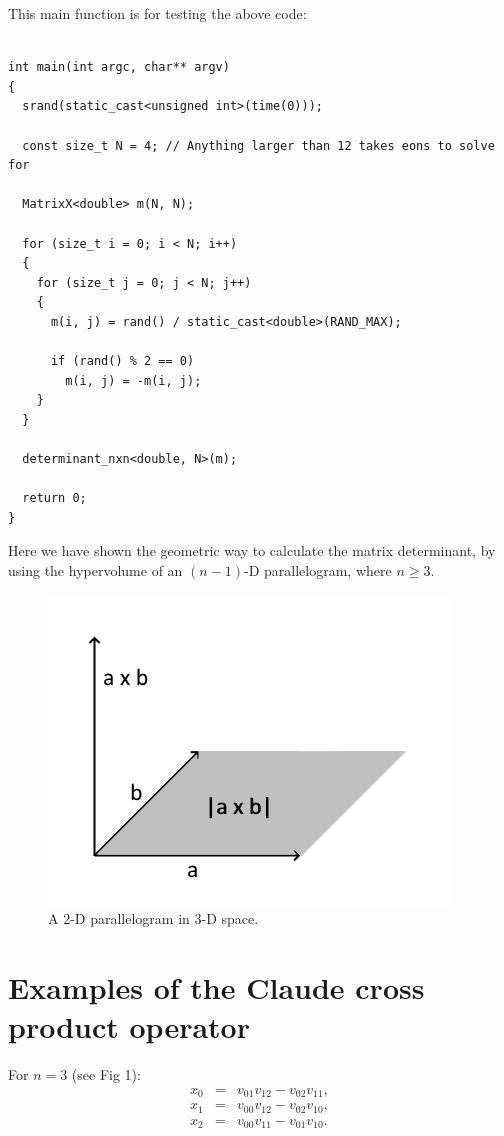 \documentclass[12pt]{article}
\begin{document}
This main function is for testing the above code:
\begin{lstlisting}

int main(int argc, char** argv)
{
  srand(static_cast<unsigned int>(time(0)));

  const size_t N = 4; // Anything larger than 12 takes eons to solve for

  MatrixX<double> m(N, N);

  for (size_t i = 0; i < N; i++)
  {
    for (size_t j = 0; j < N; j++)
    {
      m(i, j) = rand() / static_cast<double>(RAND_MAX);

      if (rand() % 2 == 0)
        m(i, j) = -m(i, j);
    }
  }

  determinant_nxn<double, N>(m);

  return 0;
}
\end{lstlisting}
Here we have shown the geometric way to calculate the matrix determinant, by using the hypervolume of an $(n - 1)$-D parallelogram, where $n \ge 3$.

\begin{figure} 
\centering
  \includegraphics[width = 3 in]{parallelogram.png}
  \caption{
A $2$-D parallelogram in $3$-D space.
}
\end{figure}

\section{Examples of the Claude cross product operator}
For $n = 3$ (see Fig 1):
\begin{eqnarray}
x_{0} &=& v_{01} v_{12} - v_{02} v_{11},\\
x_{1} &=& v_{00} v_{12} - v_{02} v_{10},\\
x_{2} &=& v_{00} v_{11} - v_{01} v_{10}.
\end{eqnarray}
\end{document}
